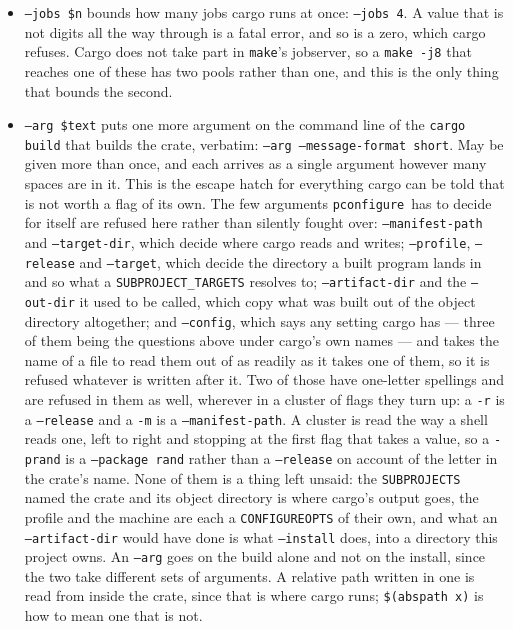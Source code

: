 \documentclass{article}
\newcommand{\pconfigure}{\texttt{pconfigure}}
\begin{document}
\begin{itemize}
\item \texttt{--jobs \$n} bounds how many jobs cargo runs at once:
  \texttt{--jobs 4}.  A value that is not digits all the way through
  is a fatal error, and so is a zero, which cargo refuses.  Cargo does
  not take part in \texttt{make}'s jobserver, so a \texttt{make -j8}
  that reaches one of these has two pools rather than one, and this is
  the only thing that bounds the second.

\item \texttt{--arg \$text} puts one more argument on the command
  line of the \texttt{cargo build} that builds the crate, verbatim:
  \texttt{--arg --message-format short}.  May be given more than
  once, and each arrives as a single argument however many spaces are
  in it.  This is the escape hatch
  for everything cargo can be told that is not worth a flag of its
  own.  The few arguments \pconfigure\ has to decide for itself are
  refused here rather than silently fought over:
  \texttt{--manifest-path} and \texttt{--target-dir}, which decide
  where cargo reads and writes; \texttt{--profile},
  \texttt{--release} and \texttt{--target}, which decide the
  directory a built program lands in and so what a
  \texttt{SUBPROJECT\_TARGETS} resolves to; \texttt{--artifact-dir}
  and the \texttt{--out-dir} it used to be called, which copy what
  was built out of the object directory altogether; and
  \texttt{--config}, which says any setting cargo has --- three of
  them being the questions above under cargo's own names --- and takes
  the name of a file to read them out of as readily as it takes one of
  them, so it is refused whatever is written after it.  Two of those
  have one-letter spellings and are refused in them as well, wherever
  in a cluster of flags they turn up: a \texttt{-r} is a
  \texttt{--release} and a \texttt{-m} is a
  \texttt{--manifest-path}.  A cluster is read the way a shell reads
  one, left to right and stopping at the first flag that takes a
  value, so a \texttt{-prand} is a \texttt{--package rand} rather
  than a \texttt{--release} on account of the letter in the crate's
  name.  None of them is a thing left unsaid: the
  \texttt{SUBPROJECTS} named the crate and its object directory is
  where cargo's output goes, the profile and the machine are each a
  \texttt{CONFIGUREOPTS} of their own, and what an
  \texttt{--artifact-dir} would have done is what \texttt{--install}
  does, into a directory this project owns.  An \texttt{--arg} goes
  on the build alone and not on the install, since the two take
  different sets of arguments.  A relative path written in one is read
  from inside the crate, since that is where cargo runs;
  \texttt{\$(abspath x)} is how to mean one that is not.


\end{itemize}
\end{document}
